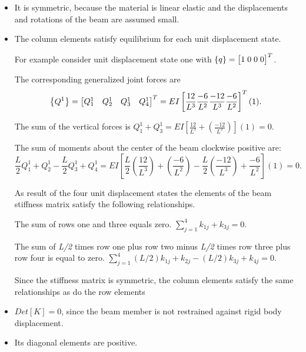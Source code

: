 \documentclass{AeroStructure-ERJohnson}
\begin{document}
\begin{itemize}
\item It is symmetric, because the material is linear elastic and the displacements and rotations of the beam are assumed small.

\item The column elements satisfy equilibrium for each unit displacement state.

For example consider unit displacement state one with $\{q\}=\left[\begin{array}{@{}l@{\;}l@{\;}l@{\;}l@{}}1 & 0 & 0 & 0\end{array}\right]^{T}$.

The corresponding generalized joint forces are
\[
\left\{Q^{1}\right\}=\left[\begin{array}{@{}llll@{}}
Q_{1}^{1} & Q_{2}^{1} & Q_{3}^{1} & Q_{4}^{1}\end{array}\right]^{T}=E I\left[\frac{12}{L^{3}} \frac{-6}{L^{2}} \frac{-12}{L^{3}} \frac{-6}{L^{2}}\right]^{T}(1).
\]

The sum of the vertical forces is $Q_{1}^{1}+Q_{3}^{1}=E I\left[\frac{12}{L^{3}}+\left(\frac{-12}{L^{3}}\right)\right](1)=0$.

The sum of moments about the center of the beam clockwise positive are:
\[
\frac{L}{2} Q_{1}^{1}+Q_{2}^{1}-\frac{L}{2} Q_{3}^{1}+Q_{4}^{1}=E I\left[\frac{L}{2}\left(\frac{12}{L^{3}}\right)+\left(\frac{-6}{L^{2}}\right)-\frac{L}{2}\left(\frac{-12}{L^{3}}\right)+\frac{-6}{L^{2}}\right](1)=0.
\]

As result of the four unit displacement states the elements of the beam stiffness matrix satisfy the following relationships.

The sum of rows one and three equals zero. $\sum\limits_{j=1}^4 k_{1 j}+k_{3 j}=0$.

The sum of \textit{L/2} times row one plus row two minus \textit{L/2} times row three plus row four is equal to zero. $\sum\limits_{j=1}^4(L / 2) k_{1 j}+k_{2 j}-(L / 2) k_{3 j}+k_{4 j}=0$.

Since the stiffness matrix is symmetric, the column elements satisfy the same relationships as do the row elements

\item ${Det}[K]=0$, since the beam member is not restrained against rigid body displacement.

\item Its diagonal elements are positive.
\end{itemize}
\end{document}
